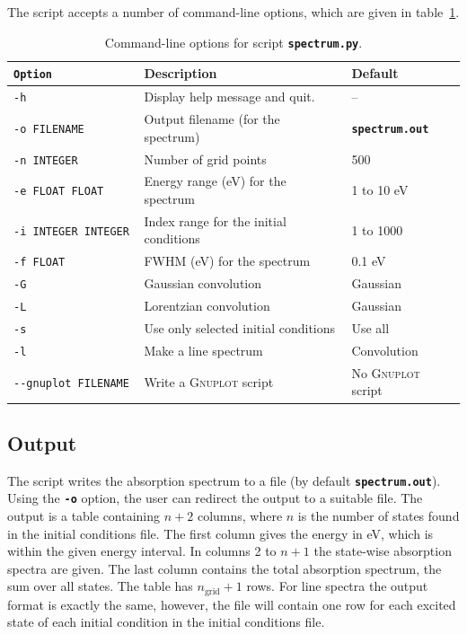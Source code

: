 \documentclass[a4paper,11pt,DIV=15,openany,twoside=false]{scrbook}
\newcommand{\ttt}[1]{\textbf{\texttt{#1}}}
\begin{document}
The script accepts a number of command-line options, which are given in table~\ref{tab:spectrum_opts}.
\begin{table}
  \centering
  \caption{Command-line options for script \ttt{spectrum.py}.}
  \label{tab:spectrum_opts}
  \begin{tabular}{>{\tt}lll}
    \toprule
    \rmfamily Option        &Description      &Default\\
    \midrule
    -h                  &Display help message and quit.         & --        \\
    -o FILENAME         &Output filename (for the spectrum)     &\ttt{spectrum.out}\\
    -n INTEGER          &Number of grid points                  &500       \\
    -e FLOAT FLOAT      &Energy range (eV) for the spectrum     &1 to 10 eV\\
    -i INTEGER INTEGER  &Index range for the initial conditions &1 to 1000\\
    -f FLOAT            &FWHM (eV) for the spectrum             &0.1 eV\\
    -G                  &Gaussian convolution                   &Gaussian\\
    -L                  &Lorentzian convolution                 &Gaussian\\
    -s                  &Use only selected initial conditions   &Use all\\
    -l                  &Make a line spectrum                   &Convolution\\
    -{}-gnuplot FILENAME  &Write a \textsc{Gnuplot} script        &No \textsc{Gnuplot} script\\
    \bottomrule
  \end{tabular}
\end{table}

\subsection{Output}

The script writes the absorption spectrum to a file (by default \ttt{spectrum.out}). Using the \ttt{-o} option, the user can redirect the output to a suitable file. The output is a table containing $n+2$ columns, where $n$ is the number of states found in the initial conditions file. The first column gives the energy in eV, which is within the given energy interval. In columns 2 to $n+1$ the state-wise absorption spectra are given. The last column contains the total absorption spectrum, the sum over all states. The table has $n_{\text{grid}}+1$ rows. For line spectra the output format is exactly the same, however, the file will contain one row for each excited state of each initial condition in the initial conditions file.
\end{document}
